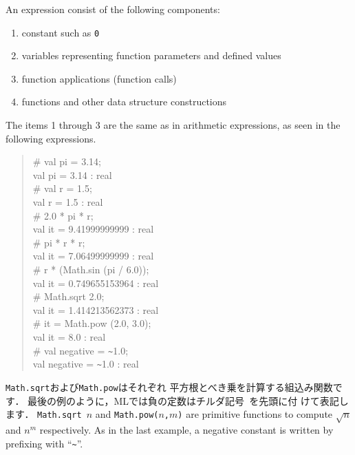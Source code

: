 \documentclass{jbook}
\newcommand{\txt}[2]{#2}
\begin{document}
\txt
{
	式は以下の要素を組み合わせて構成されます．
\begin{enumerate}
\item {\tt 0}などの定数式
\item 関数の引数やすでに定義されている値を表す変数
\item 関数呼び出し
\item 関数を含む種々のデータ構造の構成
\end{enumerate}
	１から３までの組み合わせは，高校などで慣れ親しんだ算術式と同じ構
造を持っています．
	以下にこれらを組み合わせた対話型プログラミングの例を示します．
}
{
	An expression consist of the following components:
\begin{enumerate}
\item constant such as {\tt 0}
\item variables representing function parameters and defined values
\item function applications (function calls)
\item functions and other data structure constructions
\end{enumerate}
	The items 1 through 3 are the same as in arithmetic expressions,
as seen in the following expressions.
}
\begin{tt}
\begin{quote}
\# val pi = 3.14;\\
val pi = 3.14 : real\\
\# val r = 1.5;\\
val r = 1.5 : real\\
\# 2.0 * pi * r;\\
val it = 9.41999999999 : real\\
\# pi * r * r;\\
val it = 7.06499999999 : real\\
\# r * (Math.sin (pi / 6.0));\\
val it = 0.749655153964 : real\\
\# Math.sqrt 2.0;\\
val it = 1.414213562373 : real\\
\# it  = Math.pow (2.0, 3.0);\\
val it = 8.0 : real\\
\# val negative = \verb|~|1.0;\\
val negative = \verb|~|1.0 : real
\end{quote}
\end{tt}
\ifx\jp%
	{\tt Math.sqrt}および{\tt Math.pow}はそれぞれ
平方根とべき乗を計算する組込み関数です．
	最後の例のように，MLでは負の定数はチルダ記号{\tt ~}を先頭に付
けて表記します．
\else%
	{\tt Math.sqrt $n$} and {\tt Math.pow($n$,$m$)} are primitive
functions to compute $\sqrt{n}$ and $n^m$ respectively.
	As in the last example, a negative constant is written by
prefixing with ``{\tt \verb|~|}''.
\fi%
\end{document}
